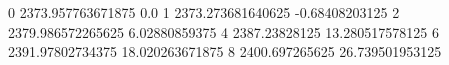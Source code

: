 0 2373.957763671875 0.0
1 2373.273681640625 -0.68408203125
2 2379.986572265625 6.02880859375
4 2387.23828125 13.280517578125
6 2391.97802734375 18.020263671875
8 2400.697265625 26.739501953125

